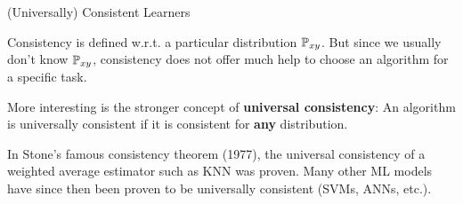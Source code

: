 \documentclass[11pt,compress,t,notes=noshow, xcolor=table]{beamer}
\begin{document}
\begin{frame}{(Universally) Consistent Learners }

Consistency is defined w.r.t. a particular distribution $\mathbb{P}_{xy}$.
But since we usually don't know $\mathbb{P}_{xy}$, consistency
does not offer much help to choose an algorithm for a specific task. 

\vfill 

More interesting is the stronger concept of \textbf{universal consistency}: An algorithm is universally consistent if it is consistent for \textbf{any} distribution. 

\vfill 

In Stone's famous consistency theorem (1977), the universal consistency of a weighted average estimator such as KNN was proven. Many other ML models have since then been proven to be universally consistent (SVMs, ANNs, etc.).

\end{frame}










\endlecture
\end{document}
